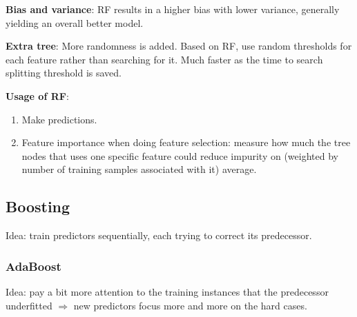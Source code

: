 \documentclass[12pt,oneside,a4paper]{article}
\numberwithin{equation}{section}
\begin{document}
\textbf{Bias and variance}: RF results in a higher bias with lower variance, generally yielding an overall better model.

\textbf{Extra tree}: More randomness is added. Based on RF, use random thresholds for each feature rather than searching for it.  Much faster as the time to search splitting threshold is saved.

\textbf{Usage of RF}:
\begin{enumerate}
\item Make predictions. 
\item Feature importance when doing feature selection: measure how much the tree nodes that uses one specific feature could reduce impurity on (weighted by number of training samples associated with it) average. 
\end{enumerate}
\subsection{Boosting} 
Idea: train predictors sequentially, each trying to correct its predecessor. 

\subsubsection{AdaBoost}
Idea: pay a bit more attention to the training instances that the predecessor underfitted $\Rightarrow$ new predictors focus more and more on the hard cases. \\~\\
\end{document}
